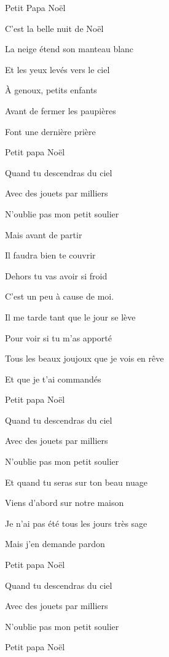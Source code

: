 \documentclass[landscape,dvipsnames,a4paper]{article}
\renewenvironment{vcenter}{\phantom{Iydon}\vfil}{\vfil}
\begin{document}
\begin{center}\color{BrickRed}
    \Huge Petit Papa No\"el
    \begin{vcenter}
        \begin{multicols}{2}\huge
        C'est la belle nuit de Noël\par
        La neige étend son manteau blanc\par
        Et les yeux levés vers le ciel\par
        À genoux, petits enfants\par
        Avant de fermer les paupières\par
        Font une dernière prière\par
        Petit papa Noël\par
        Quand tu descendras du ciel\par
        Avec des jouets par milliers\par
        N'oublie pas mon petit soulier\par
        Mais avant de partir\par
        Il faudra bien te couvrir\par
        Dehors tu vas avoir si froid\par
        C'est un peu à cause de moi.\par
        Il me tarde tant que le jour se lève\par
        Pour voir si tu m'as apporté\par
        Tous les beaux joujoux que je vois en rêve\par
        Et que je t'ai commandés\par
        Petit papa Noël\par
        Quand tu descendras du ciel\par
        Avec des jouets par milliers\par
        N'oublie pas mon petit soulier\par
        Et quand tu seras sur ton beau nuage\par
        Viens d'abord sur notre maison\par
        Je n'ai pas été tous les jours très sage\par
        Mais j'en demande pardon\par
        Petit papa Noël\par
        Quand tu descendras du ciel\par
        Avec des jouets par milliers\par
        N'oublie pas mon petit soulier\par
        Petit papa Noël
        \end{multicols}
    \end{vcenter}
\end{center}
\clearpage

\end{document}
